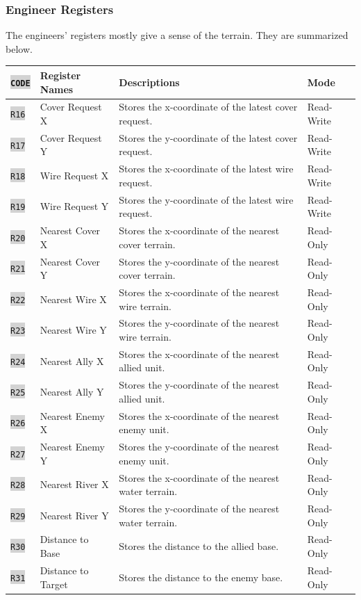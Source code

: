 \documentclass{article}
\newcommand{\vnscode}[1]{\colorbox{lightgray}{\lstinline[language=vns]{#1}}}
\begin{document}
\subsubsection{Engineer Registers}

The engineers' registers mostly give a sense of the terrain. They are summarized
below.

\begin{minipage}{\textwidth}
\centering
\begin{tabular}{llll}
    \hline \vnscode{CODE} & Register Names & Descriptions & Mode \\ \hline
    \vnscode{R16} & Cover Request X & Stores the x-coordinate of the latest cover request. & Read-Write \\
    \vnscode{R17} & Cover Request Y & Stores the y-coordinate of the latest cover request. & Read-Write \\
    \vnscode{R18} & Wire Request X & Stores the x-coordinate of the latest wire request. & Read-Write \\
    \vnscode{R19} & Wire Request Y & Stores the y-coordinate of the latest wire request. & Read-Write \\
    \vnscode{R20} & Nearest Cover X & Stores the x-coordinate of the nearest cover terrain. & Read-Only \\
    \vnscode{R21} & Nearest Cover Y & Stores the y-coordinate of the nearest cover terrain. & Read-Only \\
    \vnscode{R22} & Nearest Wire X & Stores the x-coordinate of the nearest wire terrain. & Read-Only \\
    \vnscode{R23} & Nearest Wire Y & Stores the y-coordinate of the nearest wire terrain. & Read-Only \\
    \vnscode{R24} & Nearest Ally X & Stores the x-coordinate of the nearest allied unit. & Read-Only \\
    \vnscode{R25} & Nearest Ally Y & Stores the y-coordinate of the nearest allied unit. & Read-Only \\
    \vnscode{R26} & Nearest Enemy X & Stores the x-coordinate of the nearest enemy unit. & Read-Only \\
    \vnscode{R27} & Nearest Enemy Y & Stores the y-coordinate of the nearest enemy unit. & Read-Only \\
    \vnscode{R28} & Nearest River X & Stores the x-coordinate of the nearest water terrain. & Read-Only \\
    \vnscode{R29} & Nearest River Y & Stores the y-coordinate of the nearest water terrain. & Read-Only \\
    \vnscode{R30} & Distance to Base & Stores the distance to the allied base. & Read-Only \\
    \vnscode{R31} & Distance to Target & Stores the distance to the enemy base.  & Read-Only \\
\end{tabular}
\end{minipage}
\end{document}
